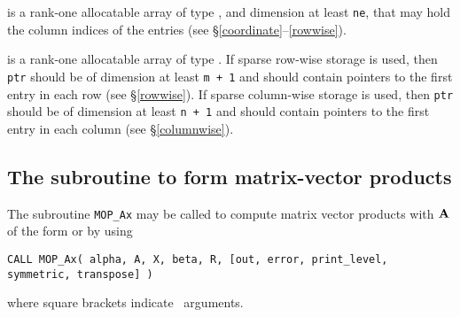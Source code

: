 \documentclass{galahad}
\newcommand{\packagename}{MOP}
\begin{document}
\begin{description}
 is a rank-one allocatable array of type \integer, 
and dimension at least {\tt ne}, that may hold the column indices of the entries
(see \S\ref{coordinate}--\ref{rowwise}).

 is a rank-one allocatable array of type \integer.
If sparse row-wise storage is used, then {\tt ptr} should be of
dimension at least {\tt m + 1} and should contain pointers to the
first entry in each row (see \S\ref{rowwise}). If sparse column-wise
storage is used, then {\tt ptr} should be of dimension at least {\tt n
  + 1} and should contain pointers to the first entry in each column (see
\S\ref{columnwise}).

\end{description}


\subsection{The subroutine to form matrix-vector products}\label{Ax}

The subroutine {\tt \packagename\_Ax} may be called to compute matrix
vector products with ${\mathbf{A}}$ of the form
or
by using
\vspace*{1mm}

\hspace{8mm}
{\tt CALL \packagename\_Ax( alpha, A, X, beta, R, [out, error,
                            print\_level, symmetric, transpose] )}

\vspace*{1mm}
\noindent where square brackets indicate \optional\ arguments. 
\end{document}
